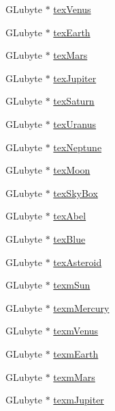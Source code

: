 \begin{DoxyCompactItemize}
\item 
G\+Lubyte $\ast$ \mbox{\hyperlink{class_scene_texture_af9d9bcbed0f4765c35f1a4a785b7fedc}{tex\+Venus}}
\item 
G\+Lubyte $\ast$ \mbox{\hyperlink{class_scene_texture_a4a2b33714928e8949304af86101e964c}{tex\+Earth}}
\item 
G\+Lubyte $\ast$ \mbox{\hyperlink{class_scene_texture_a1e09227ae29f43abfa473e75c764a26a}{tex\+Mars}}
\item 
G\+Lubyte $\ast$ \mbox{\hyperlink{class_scene_texture_aa585db7cc129b02d4c096e67ade0320e}{tex\+Jupiter}}
\item 
G\+Lubyte $\ast$ \mbox{\hyperlink{class_scene_texture_a814392ccebc283a0807df7fcb59dadcc}{tex\+Saturn}}
\item 
G\+Lubyte $\ast$ \mbox{\hyperlink{class_scene_texture_a319a5cbc76e3a921e55a49c72a68c941}{tex\+Uranus}}
\item 
G\+Lubyte $\ast$ \mbox{\hyperlink{class_scene_texture_a9f7407018a84259637bb9e1abf274dc1}{tex\+Neptune}}
\item 
G\+Lubyte $\ast$ \mbox{\hyperlink{class_scene_texture_a1f30e2089ab6a1dac646a764eda60f3b}{tex\+Moon}}
\item 
G\+Lubyte $\ast$ \mbox{\hyperlink{class_scene_texture_a1b0ce6fc3c9a06095545fa6395723420}{tex\+Sky\+Box}}
\item 
G\+Lubyte $\ast$ \mbox{\hyperlink{class_scene_texture_af512e39ce145913d8359e93f87076a66}{tex\+Abel}}
\item 
G\+Lubyte $\ast$ \mbox{\hyperlink{class_scene_texture_a1f21ab3a004beb128c15821bbab8ec9f}{tex\+Blue}}
\item 
G\+Lubyte $\ast$ \mbox{\hyperlink{class_scene_texture_a7067860db942c2e301896351dc0f5eb7}{tex\+Asteroid}}
\item 
G\+Lubyte $\ast$ \mbox{\hyperlink{class_scene_texture_acdac18fbb4997d82fef0a8275ad2ad31}{texm\+Sun}}
\item 
G\+Lubyte $\ast$ \mbox{\hyperlink{class_scene_texture_a6ce6fd7393996a7236c17192e8977e1e}{texm\+Mercury}}
\item 
G\+Lubyte $\ast$ \mbox{\hyperlink{class_scene_texture_a4de3ac9ecbf0e55dcde936f701854261}{texm\+Venus}}
\item 
G\+Lubyte $\ast$ \mbox{\hyperlink{class_scene_texture_aade0221c14da45fc9b9a80869c7485f8}{texm\+Earth}}
\item 
G\+Lubyte $\ast$ \mbox{\hyperlink{class_scene_texture_a9ef242ab0416242acf6e1603c9cbd7d9}{texm\+Mars}}
\item 
G\+Lubyte $\ast$ \mbox{\hyperlink{class_scene_texture_af94aecbb8ff37792f98dff183a40f2f6}{texm\+Jupiter}}

\end{DoxyCompactItemize}
